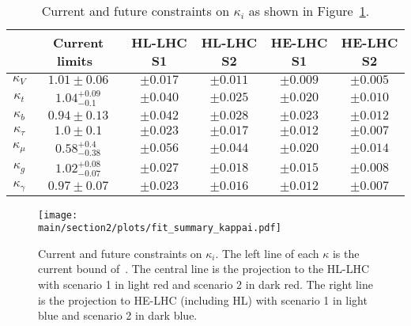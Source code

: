 \begin{table}[ht!]
\begin{center}
\begin{tabular}{ |c||c|c|c|c|c|}
  \hline
  & Current limits~\cite{deBlas:2018tjm}  & HL-LHC S1 & HL-LHC S2 & HE-LHC S1&HE-LHC S2 \\
  \hline
   $\kappa_{V}$&$1.01\pm0.06$ &$\pm 0.017$&$\pm 0.011$&$\pm 0.009$&$\pm 0.005$\\
  $\kappa_{t}$&$1.04^{+0.09}_{-0.1}$&$\pm 0.040$&$\pm 0.025$&$\pm 0.020$&$\pm 0.010$\\
  $\kappa_{b}$&$0.94\pm 0.13$ &$\pm 0.042$&$\pm 0.028$&$\pm 0.023$&$\pm 0.012$ \\
  $\kappa_{\tau}$&$1.0\pm 0.1$ &$\pm 0.023$&$\pm 0.017$& $\pm 0.012$&$\pm 0.007$\\
  $\kappa_{\mu}$&$0.58^{+0.4}_{-0.38} $ &$\pm 0.056$&$\pm 0.044$& $\pm 0.020$&$\pm 0.014$\\
  $\kappa_{g}$&$1.02^{+0.08}_{-0.07} $ &$\pm 0.027$&$\pm 0.018$& $\pm 0.015$&$\pm 0.008$\\
  $\kappa_{\gamma}$ &$0.97\pm 0.07 $&$\pm 0.023$&$\pm 0.016$&$\pm 0.012$&$\pm 0.007$\\
\hline
\end{tabular}
\caption{Current and future constraints on $\kappa_{i}$ as shown in Figure~\ref{fig:projection.kappai}.}\label{tab:projection.kappai}
\end{center}
\end{table}
%
\begin{figure}[ht]
\texttt{[image: \\main/section2/plots/fit\_summary\_kappai.pdf]}
\caption{Current and future constraints on $\kappa_{i}$. The left line of each $\kappa$ is the current bound of~\cite{deBlas:2018tjm}. The central line is the projection to the HL-LHC with scenario 1 in light red and scenario 2 in dark red. The right line is the projection to HE-LHC (including HL) with scenario 1 in light blue and scenario 2 in dark blue.}\label{fig:projection.kappai}
\end{figure}
